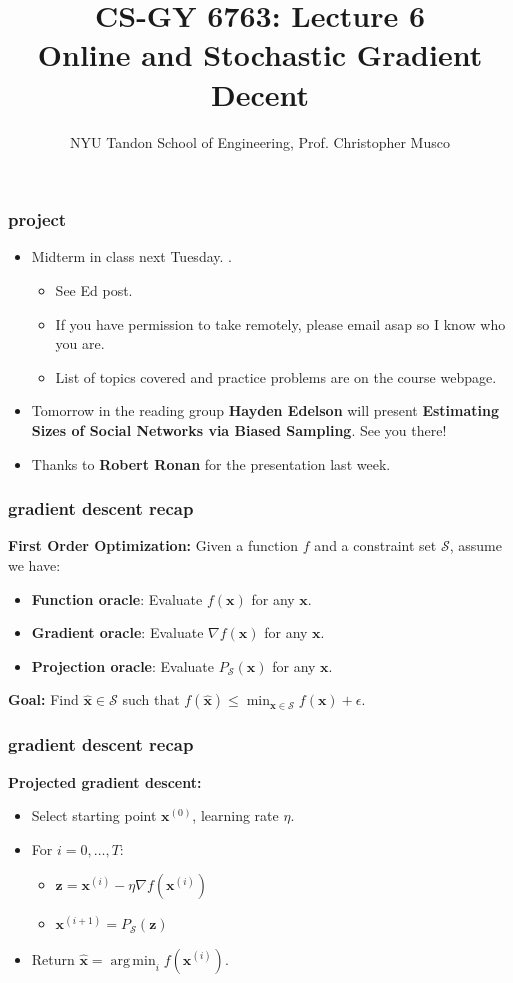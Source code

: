 \documentclass[compress]{beamer}
\title{CS-GY 6763: Lecture 6 \\ Online and Stochastic Gradient Decent}
\author{NYU Tandon School of Engineering, Prof. Christopher Musco}
\date{}
\newcommand{\bv}[1]{\mathbf{#1}}
\DeclareMathOperator*{\argmin}{arg\,min}
\begin{document}
\begin{frame}
	\titlepage 
\end{frame}


\begin{frame}[t]
	\frametitle{project}
	\begin{itemize}
		\item Midterm in class next Tuesday. . 
		\begin{itemize}
			\item See Ed post.
			\item If you have permission to take remotely, please email asap so I know who you are.
			\item List of topics covered and practice problems are on the course webpage. 
		\end{itemize}
	\item Tomorrow in the reading group \textbf{Hayden Edelson} will present \textbf{\alert{Estimating Sizes of Social Networks via Biased Sampling}}. See you there!
	\item Thanks to \textbf{Robert Ronan} for the presentation last week. 
	\end{itemize}
\end{frame}

\begin{frame}[t]
	\frametitle{gradient descent recap}
	\textbf{First Order Optimization:} Given a function $f$ and a constraint set $\mathcal{S}$, assume we have:
	\begin{itemize}
		\item \textbf{Function oracle}: Evaluate $f(\bv{x})$ for any $\bv{x}$. 
		\item \textbf{Gradient oracle}: Evaluate $\nabla f(\bv{x})$ for any $\bv{x}$.
		\item \textbf{{Projection oracle}}: Evaluate $P_{\mathcal{S}}(\bv{x})$ for any $\bv{x}$.
	\end{itemize}
\begin{center}
	\textbf{Goal:} Find $\hat{\bv{x}}\in \mathcal{S}$ such that $f(\hat{\bv{x}}) \leq \min_{\bv{x}\in \mathcal{S}}f(\bv{x})+\epsilon$.
\end{center}
\end{frame}

\begin{frame}[t]
	\frametitle{gradient descent recap}
	\textbf{Projected gradient descent:}
	\begin{itemize}
		\item Select starting point $\bv{x}^{(0)}$, learning rate $\eta$. 
		\item For $i = 0,\ldots, T$:
		\begin{itemize}
			\item $\bv{z} = \bv{x}^{(i)} - \eta \nabla f(\bv{x}^{(i)})$
			\item $\bv{x}^{(i+1)} = P_\mathcal{S}(\bv{z})$
		\end{itemize}
		\item Return $\hat{\bv{x}} = \argmin_{i} f(\bv{x}^{(i)})$.
	\end{itemize}
\end{frame}
\end{document}
